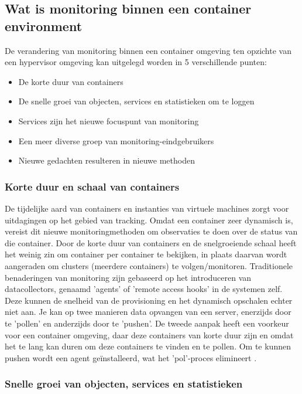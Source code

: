 \subsection{Wat is monitoring binnen een container environment}

De verandering van monitoring binnen een container omgeving ten opzichte van een hypervisor omgeving kan uitgelegd worden in 5 verschillende punten:

\begin{itemize}
    \item De korte duur van containers
    \item De snelle groei van objecten, services en statistieken om te loggen
    \item Services zijn het nieuwe focuspunt van monitoring
    \item Een meer diverse groep van monitoring-eindgebruikers
    \item Nieuwe gedachten resulteren in nieuwe methoden
\end{itemize}

\subsubsection{Korte duur en schaal van containers}

De tijdelijke aard van containers en instanties van virtuele machines zorgt voor uitdagingen op het gebied van tracking. Omdat een container zeer dynamisch is, vereist dit nieuwe monitoringmethoden om observaties te doen over de status van die container. Door de korte duur van containers en de snelgroeiende schaal heeft het weinig zin om container per container te bekijken, in plaats daarvan wordt aangeraden om clusters (meerdere containers) te volgen/monitoren. Traditionele benaderingen van monitoring zijn gebaseerd op het introduceren van datacollectors, genaamd 'agents' of 'remote access hooks' in de systemen zelf. Deze kunnen de snelheid van de provisioning en het dynamisch opschalen echter niet aan. Je kan op twee manieren data opvangen van een server, enerzijds door te 'pollen' en anderzijds door te 'pushen'. De tweede aanpak heeft een voorkeur voor een container omgeving, daar deze containers van korte duur zijn en omdat het te lang kan duren om deze containers te vinden en te pollen. Om te kunnen pushen wordt een agent geïnstalleerd, wat het 'pol'-proces elimineert \autocite{Williams2016}. 

\subsubsection{Snelle groei van objecten, services en statistieken}

